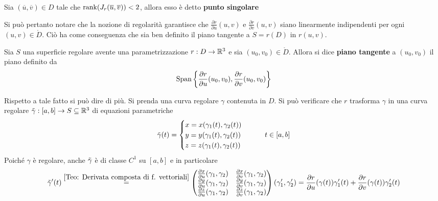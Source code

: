 \begin{definition}
    Sia $(\overline{u}, \overline{v}) \in D$ tale che $\operatorname{rank}(J_r(\overline{u}, \overline{v}))< 2$, allora esso è detto \textbf{punto singolare}
\end{definition}
Si può pertanto notare che la nozione di regolarità garantisce che $\tfrac{\partial r}{\partial u} (u,v)$ e $\tfrac{\partial r}{\partial v} (u,v)$ siano linearmente indipendenti per ogni $(u,v) \in \mathring{D}$. Ciò ha come conseguenza che sia ben definito il piano tangente a $S=r(D)$ in $r(u,v)$.
\begin{definition} \label{Def: Piano tangente ad una superficie}
    Sia $S$ una superficie regolare avente una parametrizzazione $r: D \to \mathbb{R}^3$ e sia $(u_0,v_0) \in \mathring{D}$. Allora si dice \textbf{piano tangente} a $(u_0, v_0)$ il piano definito da 
    \begin{equation}
        \operatorname{Span}\left\{\frac{\partial r}{\partial u} (u_0,v_0), \frac{\partial r}{\partial v} (u_0,v_0)\right\}
    \end{equation}
\end{definition}
Rispetto a tale fatto si può dire di più. Si prenda una curva regolare $\gamma$ contenuta in $D$. Si può verificare che $r$ trasforma $\gamma$ in una curva regolare $\Tilde{\gamma}:[a,b] \to S \subseteq \mathbb{R}^3$ di equazioni parametriche
\begin{equation}
\Tilde{\gamma}(t)= \begin{cases} 
x= x(\gamma_1(t), \gamma_2(t))\\ 
y= y(\gamma_1(t), \gamma_2(t))\\
z= z(\gamma_1(t), \gamma_2(t))
\end{cases}
\qquad t \in [a,b]
\end{equation}
Poiché $\gamma$ è regolare, anche $\Tilde{\gamma}$ è di classe $C^1$ su $[a,b]$ e in particolare
\begin{equation}
    \Tilde{\gamma}'(t)\overset{\ref{Teo: Derivata composta di f. vettoriali}}{=}
        \begin{pmatrix}
            \frac{\partial x}{\partial u}(\gamma_1,\gamma_2) & \frac{\partial x}{\partial v}(\gamma_1,\gamma_2)\\
            \frac{\partial y}{\partial u}(\gamma_1,\gamma_2) & \frac{\partial y}{\partial v}(\gamma_1,\gamma_2)\\
            \frac{\partial z}{\partial u}(\gamma_1,\gamma_2) & \frac{\partial z}{\partial v}(\gamma_1,\gamma_2)
        \end{pmatrix}
        (\gamma_1', \gamma_2') = \frac{\partial r}{\partial u}(\gamma(t))\gamma_1'(t) + \frac{\partial r}{\partial v}(\gamma(t))\gamma_2'(t)
\end{equation}
